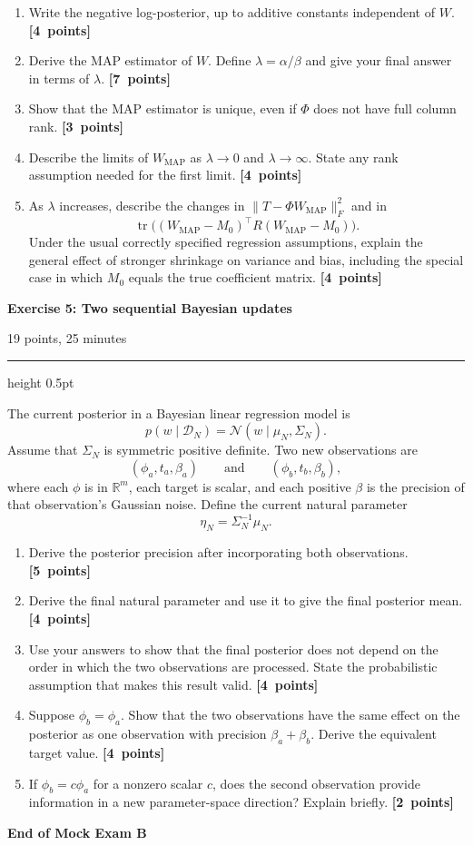 \documentclass[11pt,a4paper]{article}
\newcommand{\points}[1]{\unskip\nobreak\hfill\mbox{\textbf{[#1 points]}}}
\newcommand{\exercise}[3]{%
  \Needspace{8\baselineskip}%
  \par\addvspace{1.1em}%
  \noindent
  \begin{minipage}[t]{0.73\textwidth}
    \vspace{0pt}\raggedright\large\bfseries\color{examblue}
    Exercise #1: #2
  \end{minipage}\hfill
  \begin{minipage}[t]{0.24\textwidth}
    \vspace{0pt}\raggedleft\small\color{examblue}#3
  \end{minipage}%
  \par\nobreak\vspace{0.2em}%
  {\color{rulegray}\hrule height 0.5pt}%
  \vspace{0.55em}%
}
\begin{document}
\begin{enumerate}
  \item Write the negative log-posterior, up to additive constants independent of $W$. \points{4}
  \item Derive the MAP estimator of $W$. Define $\lambda=\alpha/\beta$ and give your final answer in terms of $\lambda$. \points{7}
  \item Show that the MAP estimator is unique, even if $\Phi$ does not have full column rank. \points{3}
  \item Describe the limits of $W_{\mathrm{MAP}}$ as $\lambda\to 0$ and $\lambda\to\infty$. State any rank assumption needed for the first limit. \points{4}
  \item As $\lambda$ increases, describe the changes in $\lVert T-\Phi W_{\mathrm{MAP}}\rVert_F^2$ and in
  \[
    \operatorname{tr}\bigl((W_{\mathrm{MAP}}-M_0)^\top R(W_{\mathrm{MAP}}-M_0)\bigr).
  \]
  Under the usual correctly specified regression assumptions, explain the general effect of stronger shrinkage on variance and bias, including the special case in which $M_0$ equals the true coefficient matrix. \points{4}
\end{enumerate}

\exercise{5}{Two sequential Bayesian updates}{19 points, 25 minutes}

The current posterior in a Bayesian linear regression model is
\[
  p(w\mid\mathcal{D}_N)=\mathcal{N}(w\mid\mu_N,\Sigma_N).
\]
Assume that $\Sigma_N$ is symmetric positive definite. Two new observations are
\[
  (\phi_a,t_a,\beta_a)
  \qquad\text{and}\qquad
  (\phi_b,t_b,\beta_b),
\]
where each $\phi$ is in $\mathbb{R}^m$, each target is scalar, and each positive $\beta$ is the precision of that observation's Gaussian noise. Define the current natural parameter
\[
  \eta_N=\Sigma_N^{-1}\mu_N.
\]

\begin{enumerate}
  \item Derive the posterior precision after incorporating both observations. \points{5}
  \item Derive the final natural parameter and use it to give the final posterior mean. \points{4}
  \item Use your answers to show that the final posterior does not depend on the order in which the two observations are processed. State the probabilistic assumption that makes this result valid. \points{4}
  \item Suppose $\phi_b=\phi_a$. Show that the two observations have the same effect on the posterior as one observation with precision $\beta_a+\beta_b$. Derive the equivalent target value. \points{4}
  \item If $\phi_b=c\phi_a$ for a nonzero scalar $c$, does the second observation provide information in a new parameter-space direction? Explain briefly. \points{2}
\end{enumerate}

\vfill
\begin{center}
  \textbf{End of Mock Exam B}
\end{center}
\end{document}
